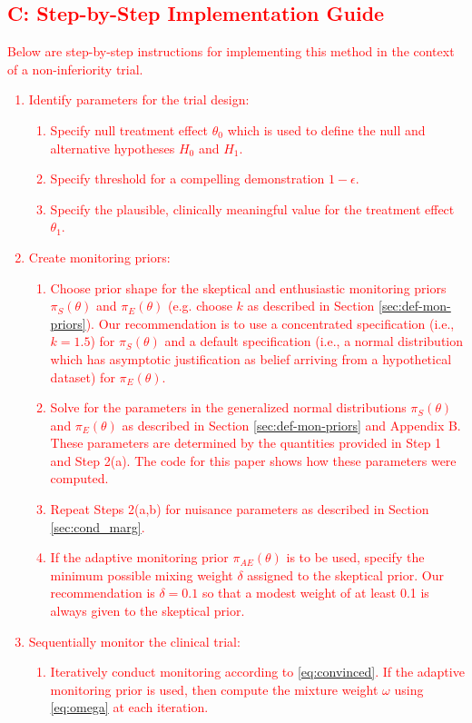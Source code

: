 \documentclass[12pt]{article}
\begin{document}
\textcolor{red}{
\subsection*{C: Step-by-Step Implementation Guide}
Below are step-by-step instructions for implementing this method in the context of a non-inferiority trial.
\begin{enumerate}
\item Identify parameters for the trial design:
\begin{enumerate}
\item Specify null treatment effect $\theta_0$ which is used to define the null and alternative hypotheses $H_0$ and $H_1$.
\item Specify threshold for a compelling demonstration $1-\epsilon$.
\item Specify the plausible, clinically meaningful value for the treatment effect $\theta_1$.
\end{enumerate}
\item Create monitoring priors:
\begin{enumerate}
\item Choose prior shape for the skeptical and enthusiastic monitoring priors $\pi_S(\theta)$ and $\pi_E(\theta)$ (e.g. choose $k$ as described in Section \ref{sec:def-mon-priors}). Our recommendation is to use a concentrated specification (i.e., $k=1.5$)  for $\pi_S(\theta)$ and a default specification (i.e., a normal distribution which has asymptotic justification as belief arriving from a hypothetical dataset) for $\pi_E(\theta)$.
\item Solve for the parameters in the generalized normal distributions $\pi_S(\theta)$ and $\pi_E(\theta)$ as described in Section \ref{sec:def-mon-priors} and Appendix B. These parameters are determined by the quantities provided in Step 1 and Step 2(a). The code for this paper shows how these parameters were computed.
\item Repeat Steps 2(a,b) for nuisance parameters as described in Section \ref{sec:cond_marg}.
\item If the adaptive monitoring prior $\pi_{AE}(\theta)$ is to be used, specify the minimum possible mixing weight $\delta$ assigned to the skeptical prior. Our recommendation is $\delta=0.1$ so that a modest weight of at least 0.1 is always given to the skeptical prior.
\end{enumerate}
\item Sequentially monitor the clinical trial:
\begin{enumerate}
\item Iteratively conduct monitoring according to \eqref{eq:convinced}. If the adaptive monitoring prior is used, then compute the mixture weight $\omega$ using \eqref{eq:omega} at each iteration.
\end{enumerate}
\end{enumerate}
}
\end{document}
